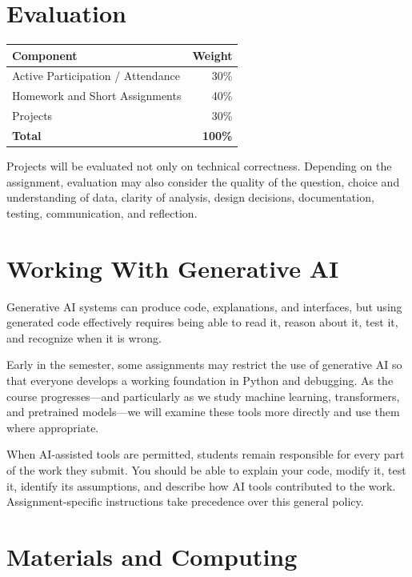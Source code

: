 \documentclass[11pt]{article}
\begin{document}
\section{Evaluation}

\begin{tabularx}{0.72\textwidth}{@{}X r@{}}
\toprule
\textbf{Component} & \textbf{Weight} \\
\midrule
Active Participation / Attendance & 30\% \\
Homework and Short Assignments & 40\% \\
Projects & 30\% \\
\midrule
\textbf{Total} & \textbf{100\%} \\
\bottomrule
\end{tabularx}

\vspace{6pt}

Projects will be evaluated not only on technical correctness. Depending on
the assignment, evaluation may also consider the quality of the question,
choice and understanding of data, clarity of analysis, design decisions,
documentation, testing, communication, and reflection.

\section{Working With Generative AI}

Generative AI systems can produce code, explanations, and interfaces, but
using generated code effectively requires being able to read it, reason about
it, test it, and recognize when it is wrong.

Early in the semester, some assignments may restrict the use of generative AI
so that everyone develops a working foundation in Python and debugging. As
the course progresses---and particularly as we study machine learning,
transformers, and pretrained models---we will examine these tools more
directly and use them where appropriate.

When AI-assisted tools are permitted, students remain responsible for every
part of the work they submit. You should be able to explain your code, modify
it, test it, identify its assumptions, and describe how AI tools contributed
to the work. Assignment-specific instructions take precedence over this
general policy.

\section{Materials and Computing}
\end{document}
